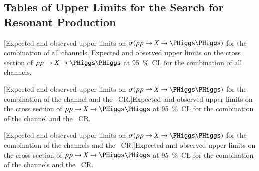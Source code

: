 \subsection{Tables of Upper Limits for the Search for Resonant \HH Production}%
\label{app:limit_tables}

{
  \centering

  \vspace*{1em}

  [Expected and observed upper limits on
  $\sigma(\pp \to X \to \HH)$ for the combination of all channels.]{Expected and
    observed upper limits on the cross section of $\pp \to X \to \HH$ at
    \SI{95}{\percent}~CL for the combination of all channels.}%
  \label{tab:comb_limits_resonant}

  
}

\clearpage

{
  \centering

  \null\vfill

  [Expected and observed upper limits on
  $\sigma(\pp \to X \to \HH)$ for the combination of the \hadhad channel and
  the \ZHF~CR.]{Expected and observed upper limits on the cross section of
    $\pp \to X \to \HH$ at \SI{95}{\percent}~CL for the combination of the \hadhad
    channel and the \ZHF~CR.}%
  \label{tab:hadhad_limits_resonant}

  

  \null\vfill
}

\clearpage

{
  \centering

  \null\vfill

  [Expected and observed upper limits on
  $\sigma(\pp \to X \to \HH)$ for the combination of the \lephad channels and
  the \ZHF~CR.]{Expected and observed upper limits on the cross section of
    $\pp \to X \to \HH$ at \SI{95}{\percent}~CL for the combination of the
    \lephad channels and the \ZHF~CR.}%
  \label{tab:lephad_limits_resonant}

  

  \null\vfill
}


\clearpage
